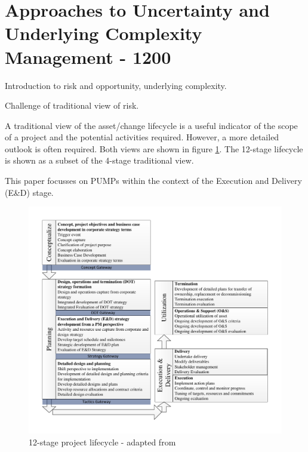 
\section{Approaches to Uncertainty and Underlying Complexity Management - 1200}

Introduction to risk and opportunity, underlying complexity. 

Challenge of traditional view of risk.

A traditional view of the asset/change lifecycle is a useful indicator of the scope of a project and the potential activities required.
However, a more detailed outlook is often required.
Both views are shown in figure \ref{Figure:Project_Lifecycle}.
The 12-stage lifecycle is shown as a subset of the 4-stage traditional view.

This paper focusses on PUMPs within the context of the Execution and Delivery (E\&D) stage.

\begin{figure}[!h]
  \centering
    \includegraphics[width = \textwidth]{./Figures/ProjectLifecycleDetailedCurve.pdf} 
\caption{12-stage project lifecycle - adapted from \cite{chapman}}
\label{Figure:Project_Lifecycle}
\end{figure}

